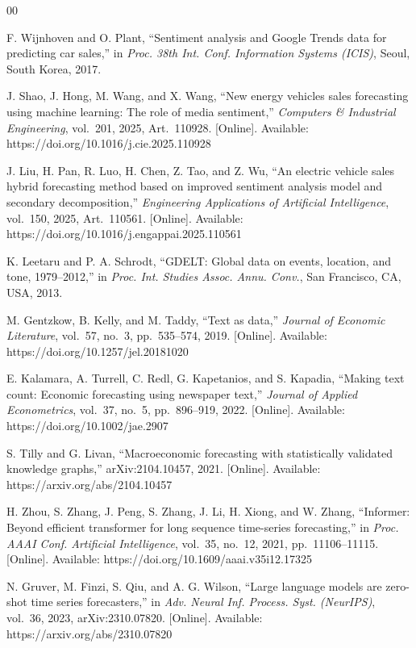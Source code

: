 \documentclass[conference]{IEEEtran}
\begin{document}
\begin{thebibliography}{00}

 F. Wijnhoven and O. Plant, ``Sentiment analysis and
Google Trends data for predicting car sales,'' in \emph{Proc. 38th Int. Conf.
Information Systems (ICIS)}, Seoul, South Korea, 2017.

 J. Shao, J. Hong, M. Wang, and X. Wang, ``New energy
vehicles sales forecasting using machine learning: The role of media
sentiment,'' \emph{Computers \& Industrial Engineering}, vol.~201, 2025,
Art.~110928. [Online]. Available: https://doi.org/10.1016/j.cie.2025.110928

 J. Liu, H. Pan, R. Luo, H. Chen, Z. Tao, and Z. Wu, ``An
electric vehicle sales hybrid forecasting method based on improved sentiment
analysis model and secondary decomposition,'' \emph{Engineering Applications of
Artificial Intelligence}, vol.~150, 2025, Art.~110561. [Online]. Available:
https://doi.org/10.1016/j.engappai.2025.110561

 K. Leetaru and P. A. Schrodt, ``GDELT: Global data on
events, location, and tone, 1979--2012,'' in \emph{Proc. Int. Studies Assoc.
Annu. Conv.}, San Francisco, CA, USA, 2013.

 M. Gentzkow, B. Kelly, and M. Taddy, ``Text as data,''
\emph{Journal of Economic Literature}, vol.~57, no.~3, pp.~535--574, 2019.
[Online]. Available: https://doi.org/10.1257/jel.20181020

 E. Kalamara, A. Turrell, C. Redl, G. Kapetanios, and
S. Kapadia, ``Making text count: Economic forecasting using newspaper text,''
\emph{Journal of Applied Econometrics}, vol.~37, no.~5, pp.~896--919, 2022.
[Online]. Available: https://doi.org/10.1002/jae.2907

 S. Tilly and G. Livan, ``Macroeconomic forecasting with
statistically validated knowledge graphs,'' arXiv:2104.10457, 2021. [Online].
Available: https://arxiv.org/abs/2104.10457

 H. Zhou, S. Zhang, J. Peng, S. Zhang, J. Li, H. Xiong,
and W. Zhang, ``Informer: Beyond efficient transformer for long sequence
time-series forecasting,'' in \emph{Proc. AAAI Conf. Artificial Intelligence},
vol.~35, no.~12, 2021, pp.~11106--11115. [Online]. Available:
https://doi.org/10.1609/aaai.v35i12.17325

 N. Gruver, M. Finzi, S. Qiu, and A. G. Wilson, ``Large
language models are zero-shot time series forecasters,'' in \emph{Adv. Neural
Inf. Process. Syst. (NeurIPS)}, vol.~36, 2023, arXiv:2310.07820. [Online].
Available: https://arxiv.org/abs/2310.07820


\end{thebibliography}
\end{document}
